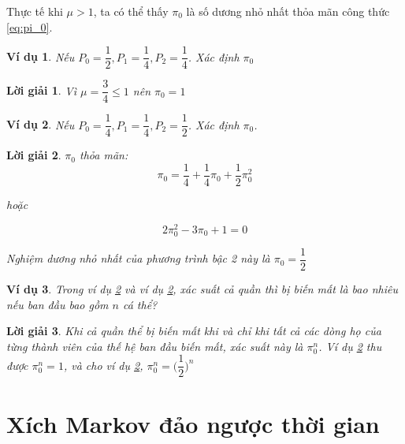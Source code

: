 \documentclass[14pt, a4paper]{article}
\numberwithin{equation}{section}
\numberwithin{figure}{section}
\theoremstyle{sltheorem}
\newtheorem{vd}{Ví dụ}
\theoremstyle{soltheorem}
\newtheorem*{loigiai}{Lời giải}
\numberwithin{dl}{section}
\numberwithin{md}{section}
\numberwithin{vd}{section}
\begin{document}
    Thực tế khi $\mu > 1$, ta có thể thấy $\pi_0$ là số dương nhỏ nhất thỏa mãn công thức \ref{eq:pi_0}.

    \begin{vd}
        Nếu $P_0 = \dfrac{1}{2}, P_1 = \dfrac{1}{4}, P_2 = \dfrac{1}{4}$. Xác định $\pi_0$
    \end{vd}

    \begin{loigiai}
        Vì $\mu = \dfrac{3}{4} \leq 1$ nên $\pi_0 = 1$
    \end{loigiai}

    \begin{vd} \label{vd:4.32}
        Nếu $P_0 = \dfrac{1}{4}, P_1 = \dfrac{1}{4}, P_2 = \dfrac{1}{2}$. Xác định $\pi_0$.
    \end{vd}

    \begin{loigiai} \label{vd:4.33}
        $\pi_0$ thỏa mãn:
        \begin{equation*}
            \pi_0 = \dfrac{1}{4} + \dfrac{1}{4} \pi_0 + \dfrac{1}{2} \pi_0^2
        \end{equation*}

        hoặc

        \begin{equation*}
            2 \pi_0^2 - 3 \pi_0 + 1 = 0
        \end{equation*}

        Nghiệm dương nhỏ nhất của phương trình bậc 2 này là $\pi_0 = \dfrac{1}{2}$
    \end{loigiai}

    \begin{vd}
        Trong ví dụ \ref{vd:4.32} và ví dụ \ref{vd:4.33}, xác suất cả quần thì bị biến mất là bao nhiêu nếu ban đầu bao gồm $n$ cá thể?
    \end{vd}

    \begin{loigiai}
        Khi cả quần thể bị biến mất khi và chỉ khi tất cả các dòng họ của từng thành viên của thế hệ ban đầu biến mất, xác suất này là $\pi_0^n$.
        Ví dụ \ref{vd:4.32} thu được $\pi_0^n = 1$, và cho ví dụ \ref{vd:4.33}, $\pi_0^n = \Big ( \dfrac{1}{2} \Big )^n$
    \end{loigiai}

    \section{Xích Markov đảo ngược thời gian}
\end{document}
